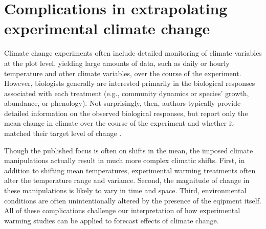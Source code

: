 \documentclass{article}
\begin{document}
\section* {Complications in extrapolating experimental climate change}
Climate change experiments often include detailed monitoring of climate variables at the plot level, yielding large amounts of data, such as daily or hourly temperature and other climate variables, over the course of the experiment. However, biologists generally are interested primarily in the biological responses associated with each treatment (e.g., community dynamics or species' growth, abundance, or phenology). Not surprisingly, then, authors typically provide detailed information on the observed biological responses, but report only the mean change in climate over the course of the experiment and whether it matched their target level of change \citep[e.g.][]{price1998,clark2014a,clark2014b,rollinson2012}. 
\par Though the published focus is often on shifts in the mean, the imposed climate manipulations actually result in much more complex climatic shifts. First, in addition to shifting mean temperatures, experimental warming treatments often alter the temperature range and variance. Second, the magnitude of change in these manipulations is likely to vary in time and space. Third, environmental conditions are often unintentionally altered by the presence of the eqipment itself. All of these complications challenge our interpretation of how experimental warming studies can be applied to forecast effects of climate change.
\end{document}
